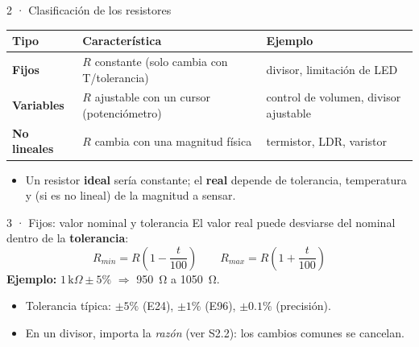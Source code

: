 \documentclass[aspectratio=169]{beamer}
\begin{document}
\begin{frame}{2 · Clasificación de los resistores}
  \begin{table}
    \small
    \begin{tabular}{p{}p{}p{}}
      \toprule
      Tipo & Característica & Ejemplo \\
      \midrule
      \textbf{Fijos} & $R$ constante (solo cambia con T/tolerancia) & divisor, limitación de LED \\
      \textbf{Variables} & $R$ ajustable con un cursor (potenciómetro) & control de volumen, divisor ajustable \\
      \textbf{No lineales} & $R$ cambia con una magnitud física & termistor, LDR, varistor \\
      \bottomrule
    \end{tabular}
  \end{table}
  \pause
  \begin{itemize}
    \item Un resistor \textbf{ideal} sería constante; el \textbf{real} depende de
      tolerancia, temperatura y (si es no lineal) de la magnitud a sensar.
  \end{itemize}
\end{frame}

\begin{frame}{3 · Fijos: valor nominal y tolerancia}
  El valor real puede desviarse del nominal dentro de la \textbf{tolerancia}:
  \[
    R_{min} = R\left(1-\frac{t}{100}\right)
    \qquad
    R_{max} = R\left(1+\frac{t}{100}\right)
  \]
  \textbf{Ejemplo:} $1\,\text{k}\Omega \pm 5\text{\%}$ $\Rightarrow$ \SI{950}{\ohm} a \SI{1050}{\ohm}.
  \pause
  \begin{itemize}
    \item Tolerancia típica: $\pm5\text{\%}$ (E24), $\pm1\text{\%}$ (E96), $\pm0.1\text{\%}$ (precisión).
    \item En un divisor, importa la \emph{razón} (ver S2.2): los cambios comunes se cancelan.
  \end{itemize}
\end{frame}
\end{document}
